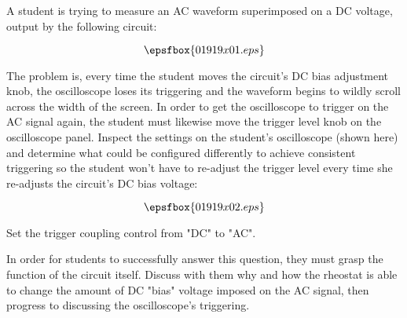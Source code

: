 

A student is trying to measure an AC waveform superimposed on a DC voltage, output by the following circuit:

$$\epsfbox{01919x01.eps}$$

The problem is, every time the student moves the circuit's DC bias adjustment knob, the oscilloscope loses its triggering and the waveform begins to wildly scroll across the width of the screen.  In order to get the oscilloscope to trigger on the AC signal again, the student must likewise move the trigger level knob on the oscilloscope panel.  Inspect the settings on the student's oscilloscope (shown here) and determine what could be configured differently to achieve consistent triggering so the student won't have to re-adjust the trigger level every time she re-adjusts the circuit's DC bias voltage:

$$\epsfbox{01919x02.eps}$$







Set the trigger coupling control from "DC" to "AC".







In order for students to successfully answer this question, they must grasp the function of the circuit itself.  Discuss with them why and how the rheostat is able to change the amount of DC "bias" voltage imposed on the AC signal, then progress to discussing the oscilloscope's triggering.




